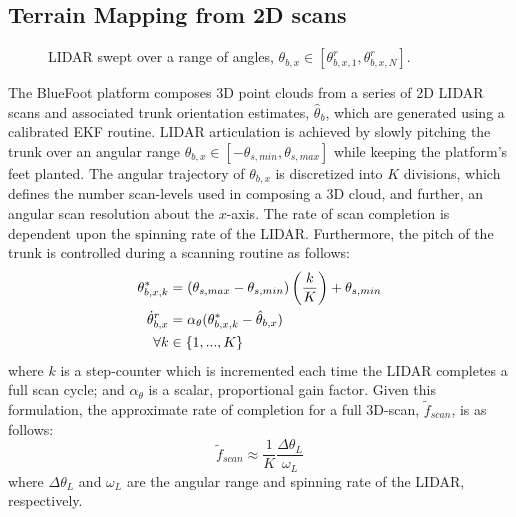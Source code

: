 		\subsection{Terrain Mapping from 2D scans}
			\label{ssec::terrain_mapping}
			\begin{figure}[!h]
				\centering
				\caption{LIDAR swept over a range of angles, $\theta_{b,x} \in [\theta_{b,x,1}^{r},\theta_{b,x,N}^{r}]$. }
				\label{fig::sensor_sweep}
			\end{figure}
			The BlueFoot platform composes 3D point clouds from a series of 2D LIDAR scans and associated trunk orientation estimates, $\hat{\theta}_{b}$, which are generated using a calibrated EKF routine. LIDAR articulation is achieved by slowly pitching the trunk over an angular range $\theta_{b,x}\in[-\theta_{s,min},\theta_{s,max}]$ while keeping the platform's feet planted. The angular trajectory of $\theta_{b,x}$ is discretized into $K$ divisions, which defines the number scan-levels used in composing a 3D cloud, and further, an angular scan resolution about the $x$-axis. The rate of scan completion is dependent upon the spinning rate of the LIDAR. Furthermore, the pitch of the trunk is controlled during a scanning routine as follows:
				\begin{equation}
					\begin{split}
					\theta_{b,x,k}^{*} &= 
						\left(\theta_{s,max}-\theta_{s,min}\right)
							\left(\frac{k}{K}\right) + 
								\theta_{s,min} \\
					\dot{\theta}_{b,x}^{r} &=
						\alpha_{\theta}
							(\theta_{b,x,k}^{*} - \hat{\theta}_{b,x} ) \\
							\forall k &\in \{1,...,K\}
					\end{split}
				\end{equation}
			where $k$ is a step-counter which is incremented each time the LIDAR completes a full scan cycle; and $\alpha_{\theta}$ is a scalar, proportional gain factor. Given this formulation, the approximate rate of completion for a full 3D-scan, $\tilde{f}_{scan}$, is as follows:
				\begin{equation}
					\tilde{f}_{scan}\approx\frac{1}{K}\frac{\Delta\theta_{L}}{\omega_{L}}
					\label{eq::point_cloud_collection_rate}
				\end{equation}
			where $\Delta\theta_{L}$ and $\omega_{L}$ are the angular range and spinning rate of the LIDAR, respectively.

